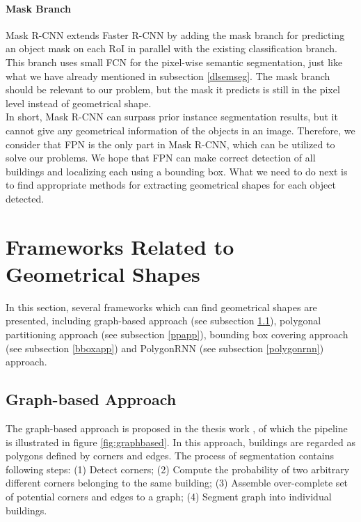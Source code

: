 \paragraph{Mask Branch}
Mask R-CNN extends Faster R-CNN by adding the mask branch for predicting an object mask on each RoI in parallel with the existing classification branch. This branch uses small FCN for the pixel-wise semantic segmentation, just like what we have already mentioned in subsection \ref{dlsemseg}. The mask branch should be relevant to our problem, but the mask it predicts is still in the pixel level instead of geometrical shape. \\

In short, Mask R-CNN can surpass prior instance segmentation results, but it cannot give any geometrical information of the objects in an image. Therefore, we consider that FPN is the only part in Mask R-CNN, which can be utilized to solve our problems. We hope that FPN can make correct detection of all buildings and localizing each using a bounding box. What we need to do next is to find appropriate methods for extracting geometrical shapes for each object detected.

\section{Frameworks Related to Geometrical Shapes}\label{frmgeo}
In this section, several frameworks which can find geometrical shapes are presented, including graph-based approach (see subsection \ref{graph}), polygonal partitioning approach (see subsection \ref{ppapp}), bounding box covering approach (see subsection \ref{bboxapp}) and PolygonRNN \cite{polygonrnn} (see subsection \ref{polygonrnn}) approach.

\subsection{Graph-based Approach}\label{graph}
The graph-based approach is proposed in the thesis work \cite{msnadine}, of which the pipeline is illustrated in figure \ref{fig:graphbased}. In this approach, buildings are regarded as polygons defined by corners and edges. The process of segmentation contains following steps: (1) Detect corners; (2) Compute the probability of two arbitrary different corners belonging to the same building; (3) Assemble over-complete set of potential corners and edges to a graph; (4) Segment graph into individual buildings.



